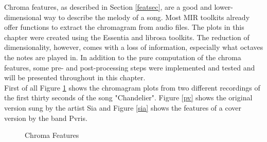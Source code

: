 Chroma features, as described in Section \ref{featsec}, are a good and lower-dimensional way to describe the melody of a song. Most MIR toolkits already offer functions to extract the chromagram from audio files. The plots in this chapter were created using the Essentia \cite{essentia1} and librosa \cite{librosa1} toolkits. 
The reduction of dimensionality, however, comes with a loss of information, especially what octaves the notes are played in. In addition to the pure computation of the chroma features, some pre- and post-processing steps were implemented and tested and will be presented throughout in this chapter.\\
First of all Figure \ref{fig:chroma1} shows the chromagram plots from two different recordings of the first thirty seconds of the song "Chandelier". Figure \ref{pv} shows the original version sung by the artist Sia and Figure \ref{sia} shows the features of a cover version by the band Pvris. 
\begin{figure}[htbp]
	\centering
	\caption{Chroma Features}
	\label{fig:chroma1}
\end{figure}
